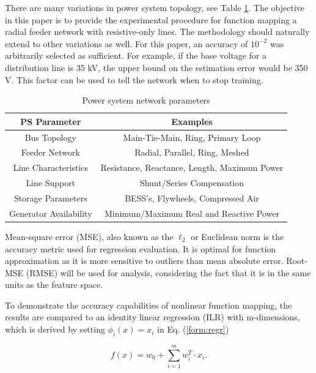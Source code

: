 \documentclass[conference]{IEEEtran}
\begin{document}
There are many variations in power system topology, see Table \ref{table:sim model}. The objective in this paper is to provide the experimental procedure for function mapping a radial feeder network with resistive-only lines. The methodology should naturally extend to other variations as well. For this paper, an accuracy of $10^{-2}$ was arbitrarily selected as sufficient. For example, if the base voltage for a distribution line is 35 kV, the upper bound on the estimation error would be 350 V. This factor can be used to tell the network when to stop training.

\begin{table}[h]
\centering
\caption[Power system network parameters]{Power system network parameters}
 \begin{tabular}{|c c|} 
  \hline
PS Parameter & Examples \\ %
 \hline\hline
Bus Topology & Main-Tie-Main, Ring, Primary Loop \\
 \hline
Feeder Network & Radial, Parallel, Ring, Meshed  \\ 
 \hline
Line Characteristics & Resistance, Reactance, Length, Maximum Power  \\
\hline
Line Support & Shunt/Series Compensation \\
\hline
Storage Parameters & BESS's, Flywheels, Compressed Air \\
\hline
Generator Availability & Minimum/Maximum Real and Reactive Power \\
\hline
\end{tabular} \vspace{1mm}
\label{table:sim model}
\end{table}

Mean-square error (MSE), also known as the $\ell_{2}$ or Euclidean norm is the accuracy metric used for regression evaluation. It is optimal for function approximation as it is more sensitive to outliers than mean absolute error. Root-MSE (RMSE) will be used for analysis, considering the fact that it is in the same units as the feature space.

To demonstrate the accuracy capabilities of nonlinear function mapping, the results are compared to an identity linear regression (ILR) with m-dimensions, which is derived by setting $\phi_{i}(x) = x_{i}$ in Eq. (\ref{form:regr})

\begin{equation} f(x) = w_{0} + \sum_{i =1}^{m}w_{i}^{T} \cdot x_{i}. \label{form: idnregr} \end{equation}
\end{document}

